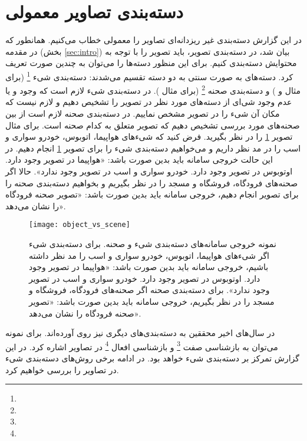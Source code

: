 \documentclass[11pt]{article}
\begin{document}
\section{دسته‌بندی تصاویر معمولی}\label{sec:img_class}
در این گزارش دسته‌بندی غیر ریزدانه‌ای تصاویر را معمولی خطاب می‌کنیم. همانطور که در مقدمه (بخش
\ref{sec:intro})
بیان شد، در دسته‌بندی تصویر، باید تصویر را با توجه به محتوایش دسته‌بندی کنیم. برای این منظور دسته‌ها را می‌توان به چندین صورت تعریف کرد. دسته‌های به صورت سنتی به دو دسته تقسیم می‌شدند: دسته‌بندی شیء
\footnote{}
(برای مثال
 \cite{caltech101, caltech256}
و
 \cite{pascalvoc})
و دسته‌بندی صحنه
\footnote{}
(برای مثال
 \cite{mit67scene}).
در دسته‌بندی شیء لازم است که وجود و یا عدم وجود شی‌ای از دسته‌های مورد نظر در تصویر را تشخیص دهیم و لازم نیست که مکان آن شی‌ء را در تصویر مشخص نماییم. در دسته‌بندی صحنه لازم است از بین صحنه‌های مورد بررسی تشخیص دهیم که تصویر متعلق به کدام صحنه است. برای مثال تصویر
\ref{fig:img_class:object_vs_scene}
را در نظر بگیرید. فرض کنید که شی‌ء‌های هواپیما، اتوبوس، خودرو سواری و اسب را در مد نظر داریم و می‌خواهیم دسته‌بندی شی‌ء را برای تصویر
\ref{fig:img_class:object_vs_scene}
انجام دهیم. در این حالت خروجی سامانه باید بدین صورت باشد: «هواپیما در تصویر وجود دارد. اوتوبوس در تصویر وجود دارد. خودرو سواری و اسب در تصویر وجود ندارد». حالا اگر صحنه‌های فرودگاه، فروشگاه و مسجد را در نظر بگیریم و بخواهیم دسته‌بندی صحنه را برای تصویر انجام دهیم، خروجی سامانه باید بدین صورت باشد: «تصویر صحنه فرودگاه را نشان می‌دهد».
\begin{figure}[t!]
	\centering
	\texttt{[image: object\_vs\_scene]}
	\caption{نمونه خروجی سامانه‌های دسته‌بندی شی‌ء و صحنه. برای دسته‌بندی شی‌ء اگر شی‌ءهای هواپیما، اتوبوس، خودرو سواری و اسب را مد نظر داشته باشیم، خروجی سامانه باید بدین صورت باشد: «هواپیما در تصویر وجود دارد. اوتوبوس در تصویر وجود دارد. خودرو سواری و اسب در تصویر وجود ندارد».
برای دسته‌بندی صحنه اگر صحنه‌های فرودگاه، فروشگاه و مسجد را در نظر بگیریم، خروجی سامانه باید بدین صورت باشد: «تصویر صحنه فرودگاه را نشان می‌دهد».}
	\label{fig:img_class:object_vs_scene}
\end{figure}

در سال‌های اخیر محققین به دسته‌بندی‌های دیگری نیز روی آورده‌اند. برای نمونه می‌توان به بازشناسی صفت
\footnote{}\cite{farhadi2009}
و بازشناسی افعال
\footnote{}
در تصاویر
\cite{bangpeng2011}
اشاره کرد.
در این گزارش تمرکز بر دسته‌بندی شی‌ء خواهد بود. در ادامه برخی روش‌های دسته‌بندی شیء در تصاویر را بررسی خواهیم کرد.
\end{document}
